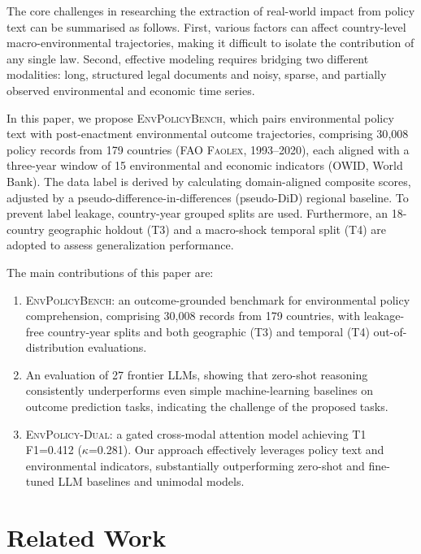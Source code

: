 \documentclass[11pt]{article}
\newcommand{\ours}{\textsc{EnvPolicy-Dual}}
\newcommand{\bench}{\textsc{EnvPolicyBench}}
\begin{document}
The core challenges in researching the extraction of real-world impact from policy text can be summarised as follows. First, various factors can affect country-level macro-environmental trajectories, making it difficult to isolate the contribution of any single law. Second, effective modeling requires bridging two different modalities: long, structured legal documents and noisy, sparse, and partially observed environmental and economic time series. 



In this paper, we propose \bench{}, which pairs environmental policy text with post-enactment environmental outcome trajectories, comprising 30{,}008 policy records from 179 countries (FAO \textsc{Faolex}, 1993--2020), each aligned with a three-year window of 15 environmental and economic indicators (OWID, World Bank). The data label is derived by calculating domain-aligned composite scores, adjusted by a pseudo-difference-in-differences (pseudo-DiD) regional baseline. To prevent label leakage, country-year grouped splits are used. Furthermore,  an 18-country geographic holdout (T3) and a macro-shock temporal split (T4) are adopted to assess generalization performance. 

The main contributions of this paper are:
\begin{enumerate}
    \item \bench: an outcome-grounded benchmark for environmental policy comprehension, comprising 30{,}008 records from 179 countries, with leakage-free country-year splits and both geographic (T3) and temporal (T4) out-of-distribution evaluations.
    \item An evaluation of 27 frontier LLMs, showing that zero-shot reasoning consistently underperforms even simple machine-learning baselines on outcome prediction tasks, indicating the challenge of the proposed tasks.
    \item \ours: a gated cross-modal attention model achieving T1 F1=0.412 ($\kappa$=0.281). Our approach effectively leverages policy text and environmental indicators, substantially outperforming zero-shot and fine-tuned LLM baselines and unimodal models.
\end{enumerate}




\section{Related Work}
\label{sec:related}
\end{document}
